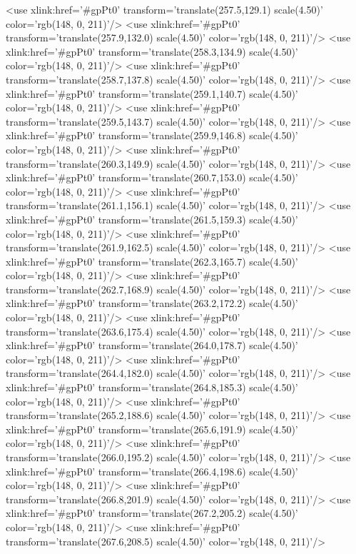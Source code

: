 	<use xlink:href='#gpPt0' transform='translate(257.5,129.1) scale(4.50)' color='rgb(148,   0, 211)'/>
	<use xlink:href='#gpPt0' transform='translate(257.9,132.0) scale(4.50)' color='rgb(148,   0, 211)'/>
	<use xlink:href='#gpPt0' transform='translate(258.3,134.9) scale(4.50)' color='rgb(148,   0, 211)'/>
	<use xlink:href='#gpPt0' transform='translate(258.7,137.8) scale(4.50)' color='rgb(148,   0, 211)'/>
	<use xlink:href='#gpPt0' transform='translate(259.1,140.7) scale(4.50)' color='rgb(148,   0, 211)'/>
	<use xlink:href='#gpPt0' transform='translate(259.5,143.7) scale(4.50)' color='rgb(148,   0, 211)'/>
	<use xlink:href='#gpPt0' transform='translate(259.9,146.8) scale(4.50)' color='rgb(148,   0, 211)'/>
	<use xlink:href='#gpPt0' transform='translate(260.3,149.9) scale(4.50)' color='rgb(148,   0, 211)'/>
	<use xlink:href='#gpPt0' transform='translate(260.7,153.0) scale(4.50)' color='rgb(148,   0, 211)'/>
	<use xlink:href='#gpPt0' transform='translate(261.1,156.1) scale(4.50)' color='rgb(148,   0, 211)'/>
	<use xlink:href='#gpPt0' transform='translate(261.5,159.3) scale(4.50)' color='rgb(148,   0, 211)'/>
	<use xlink:href='#gpPt0' transform='translate(261.9,162.5) scale(4.50)' color='rgb(148,   0, 211)'/>
	<use xlink:href='#gpPt0' transform='translate(262.3,165.7) scale(4.50)' color='rgb(148,   0, 211)'/>
	<use xlink:href='#gpPt0' transform='translate(262.7,168.9) scale(4.50)' color='rgb(148,   0, 211)'/>
	<use xlink:href='#gpPt0' transform='translate(263.2,172.2) scale(4.50)' color='rgb(148,   0, 211)'/>
	<use xlink:href='#gpPt0' transform='translate(263.6,175.4) scale(4.50)' color='rgb(148,   0, 211)'/>
	<use xlink:href='#gpPt0' transform='translate(264.0,178.7) scale(4.50)' color='rgb(148,   0, 211)'/>
	<use xlink:href='#gpPt0' transform='translate(264.4,182.0) scale(4.50)' color='rgb(148,   0, 211)'/>
	<use xlink:href='#gpPt0' transform='translate(264.8,185.3) scale(4.50)' color='rgb(148,   0, 211)'/>
	<use xlink:href='#gpPt0' transform='translate(265.2,188.6) scale(4.50)' color='rgb(148,   0, 211)'/>
	<use xlink:href='#gpPt0' transform='translate(265.6,191.9) scale(4.50)' color='rgb(148,   0, 211)'/>
	<use xlink:href='#gpPt0' transform='translate(266.0,195.2) scale(4.50)' color='rgb(148,   0, 211)'/>
	<use xlink:href='#gpPt0' transform='translate(266.4,198.6) scale(4.50)' color='rgb(148,   0, 211)'/>
	<use xlink:href='#gpPt0' transform='translate(266.8,201.9) scale(4.50)' color='rgb(148,   0, 211)'/>
	<use xlink:href='#gpPt0' transform='translate(267.2,205.2) scale(4.50)' color='rgb(148,   0, 211)'/>
	<use xlink:href='#gpPt0' transform='translate(267.6,208.5) scale(4.50)' color='rgb(148,   0, 211)'/>
